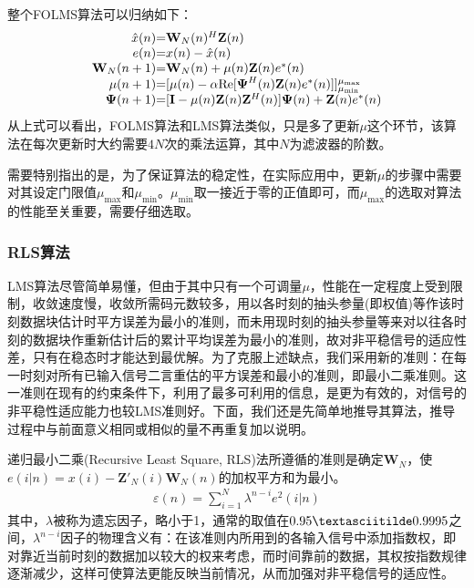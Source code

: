 整个FOLMS算法可以归纳如下：
\begin{eqnarray}
    \begin{array}{r@{\mbox{=}}l}
        \hat{x}(n)&\mathbf{W}_N(n)^H\mathbf{Z}(n)\\
        e(n)&x(n)-\hat{x}(n)\\
        \mathbf{W}_N(n+1)&\mathbf{W}_N(n)+\mu(n)\mathbf{Z}(n)e^*(n)\\
        \mu(n+1)&[\mu(n)-\alpha\mathrm{Re}[\boldsymbol{\Psi}^H(n)\mathbf{Z}(n)e^*(n)]]_{\mu_{\mathrm{min}}}^{\mu_{\mathrm{max}}}\\
        \boldsymbol{\Psi}(n+1)&[\mathbf{I}-\mu(n)\mathbf{Z}(n)\mathbf{Z}^H(n)]\boldsymbol{\Psi}(n)+\mathbf{Z}(n)e^*(n)
    \end{array}
    \label{equ:2.23}
\end{eqnarray}
从上式可以看出，FOLMS算法和LMS算法类似，只是多了更新$\mu$这个环节，该算法在每次更新时大约需要$4N$次的乘法运算，其中$N$为滤波器的阶数。

需要特别指出的是，为了保证算法的稳定性，在实际应用中，更新$\mu$的步骤中需要对其设定门限值$\mu_{\mathrm{max}}$和$\mu_{\mathrm{min}}$。$\mu_{\mathrm{min}}$取一接近于零的正值即可，而$\mu_{\mathrm{max}}$的选取对算法的性能至关重要，需要仔细选取\citep{Geller1996}。
\subsubsection*{RLS算法}
LMS算法尽管简单易懂，但由于其中只有一个可调量$\mu$，性能在一定程度上受到限制，收敛速度慢，收敛所需码元数较多，用以各时刻的抽头参量(即权值)等作该时刻数据块估计时平方误差为最小的准则，而未用现时刻的抽头参量等来对以往各时刻的数据块作重新估计后的累计平均误差为最小的准则，故对非平稳信号的适应性差，只有在稳态时才能达到最优解。为了克服上述缺点，我们采用新的准则：在每一时刻对所有已输入信号二言重估的平方误差和最小的准则，即最小二乘准则。这一准则在现有的约束条件下，利用了最多可利用的信息，是更为有效的，对信号的非平稳性适应能力也较LMS准则好。下面，我们还是先简单地推导其算法，推导过程中与前面意义相同或相似的量不再重复加以说明。

递归最小二乘(Recursive Least Square,
RLS)法所遵循的准则是确定$\mathbf{W}_N$，使$e(i|n)=x(i)-{\mathbf{Z}}'_N(i)\mathbf{W}_N(n)$的加权平方和为最小。
\begin{eqnarray}
    \varepsilon(n)=\sum_{i=1}^N\lambda^{n-i}e^2(i|n)
    \label{equ:2.24}
\end{eqnarray}
其中，$\lambda$被称为遗忘因子，略小于1，通常的取值在$0.95\textasciitilde
0.9995$之间，$\lambda^{n-i}$因子的物理含义有：在该准则内所用到的各输入信号中添加指数权，即对靠近当前时刻的数据加以较大的权来考虑，而时间靠前的数据，其权按指数规律逐渐减少，这样可使算法更能反映当前情况，从而加强对非平稳信号的适应性。

